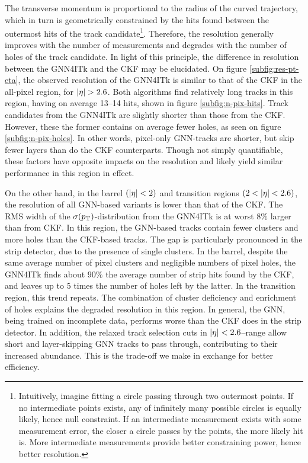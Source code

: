 The transverse momentum is proportional to the radius of the curved trajectory, which in turn is geometrically constrained 
by the hits found between the outermost hits of the track candidate\footnote{Intuitively, imagine fitting a circle passing through two outermost points. 
If no intermediate points exists, any of infinitely many possible circles is equally likely, hence null constraint. 
If an intermediate measurement exists with some measurement error, the closer a circle passes by the points, the more likely hit is. 
More intermediate measurements provide better constraining power, hence better resolution.}.
Therefore, the \pT resolution generally improves with the number of measurements and degrades with the number of holes of the track candidate. 
In light of this principle, the difference in \pT resolution between the GNN4ITk and the CKF may be elucidated.
On figure \ref{subfig:res-pt-eta}, the observed \pT resolution of the GNN4ITk is similar to that of the CKF in the all-pixel region, for $\abs{\eta}>2.6$.
Both algorithms find relatively long tracks in this region, having on average 13--14 hits, shown in figure \ref{subfig:n-pix-hits}. 
Track candidates from the GNN4ITk are slightly shorter than those from the CKF.
However, these the former contains on average fewer holes, as seen on figure \ref{subfig:n-pix-holes}. 
In other words, pixel-only GNN-tracks are shorter, but skip fewer layers than do the CKF counterparts.
Though not simply quantifiable, these factors have opposite impacts on the \pT resolution and likely yield similar performance in this region in effect.

On the other hand, in the barrel $(\abs{\eta}<2)$ and transition regions $(2<\abs{\eta}<2.6)$, the \pT resolution of all GNN-based variants is lower than that of the CKF.
The RMS width of the $\sigma(p_{\text{T}})$-distribution from the GNN4ITk is at worst $8\%$ larger than from CKF.
In this region, the GNN-based tracks contain fewer clusters and more holes than the CKF-based tracks.
The gap is particularly pronounced in the strip detector, due to the presence of single clusters. 
In the barrel, despite the same average number of pixel clusters and negligible numbers of pixel holes, 
the GNN4ITk finds about $90\%$ the average number of strip hits found by the CKF, and leaves up to 5 times the number of holes left by the latter.
In the transition region, this trend repeats.
The combination of cluster deficiency and enrichment of holes explains the degraded \pT resolution in this region.
In general, the GNN, being trained on incomplete data, performs worse than the CKF does in the strip detector. 
In addition, the relaxed track selection cuts in $\abs{\eta}<2.6$--range allow short and layer-skipping GNN tracks to pass through, contributing to their increased abundance.
This is the trade-off we make in exchange for better efficiency.

